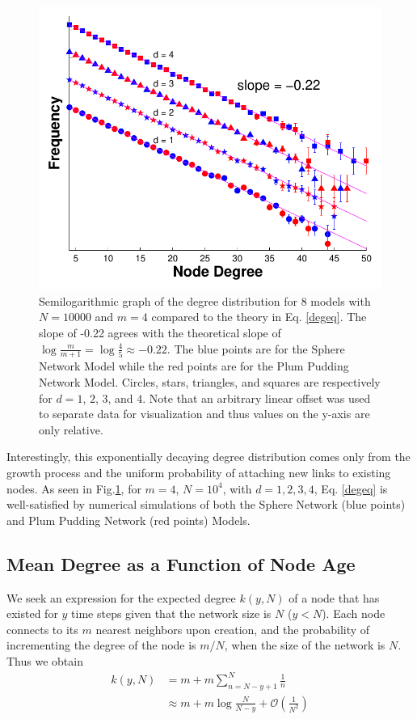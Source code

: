 \documentclass[aps,pre,manuscript,superscriptaddress,amsmath,amssymb,nofootinbib]{revtex4-1}
\begin{document}
\begin{figure}
\includegraphics[width=\linewidth]{figures/figDegDist.pdf}
\caption{\label{degdist}Semilogarithmic graph of the degree distribution for 8 models with $N = 10000$ and $m = 4$ compared to the theory in Eq. \eqref{degeq}. The slope of -0.22 agrees with the theoretical slope of $\log \frac{m}{m+1} = \log \frac{4}{5} \approx -0.22$. The blue points are for the Sphere Network Model while the red points are for the Plum Pudding Network Model. Circles, stars, triangles, and squares are respectively for $d=1$, $2$, $3$, and $4$. Note that an arbitrary linear offset was used to separate data for visualization and thus values on the y-axis are only relative.}
\end{figure}

Interestingly, this exponentially decaying degree distribution comes only from the growth process and the uniform probability of attaching new links to existing nodes.  
As seen in Fig.\ref{degdist}, for $m = 4$, $N = 10^4$, with $d = 1,2,3,4$, Eq. \eqref{degeq} is well-satisfied by numerical simulations of both the Sphere Network (blue points) and Plum Pudding Network (red points) Models.

\subsection{Mean Degree as a Function of Node Age}
We seek an expression for the expected degree $k(y,N)$ of a node that has existed for $y$ time steps given that the network size is $N$ ($y < N$).
Each node connects to its $m$ nearest neighbors upon creation, and the probability of incrementing the degree of the node is $m/N$, when the size of the network is $N$.
Thus we obtain 
\begin{equation}\label{ageeq}
\begin{split}
k(y,N)& = m + m\sum_{n=N-y+1}^{N} \frac{1}{n}\\
      & \approx m + m \log \frac{N}{N-y} + \mathcal O\left(\frac{1}{N^2}\right)
\end{split}
\end{equation}
 
\end{document}
